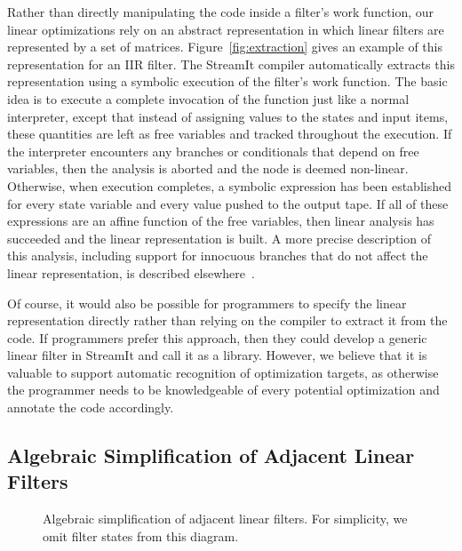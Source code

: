 Rather than directly manipulating the code inside a filter's work
function, our linear optimizations rely on an abstract representation
in which linear filters are represented by a set of matrices.
Figure~\ref{fig:extraction} gives an example of this representation
for an IIR filter.  The StreamIt compiler automatically extracts this
representation using a symbolic execution of the filter's work
function.  The basic idea is to execute a complete invocation of the
function just like a normal interpreter, except that instead of
assigning values to the states and input items, these quantities are
left as free variables and tracked throughout the execution.  If the
interpreter encounters any branches or conditionals that depend on
free variables, then the analysis is aborted and the node is deemed
non-linear.  Otherwise, when execution completes, a symbolic
expression has been established for every state variable and every
value pushed to the output tape.  If all of these expressions are an
affine function of the free variables, then linear analysis has
succeeded and the linear representation is built.  A more precise
description of this analysis, including support for innocuous branches
that do not affect the linear representation, is described
elsewhere~\cite{lamb-pldi03}.

Of course, it would also be possible for programmers to specify the
linear representation directly rather than relying on the compiler to
extract it from the code.  If programmers prefer this approach, then
they could develop a generic linear filter in StreamIt and call it as
a library.  However, we believe that it is valuable to support
automatic recognition of optimization targets, as otherwise the
programmer needs to be knowledgeable of every potential optimization
and annotate the code accordingly.

\subsection*{Algebraic Simplification of Adjacent Linear Filters}

\begin{figure}[t]
\centering
{}
\caption[Algebraic simplification of adjacent linear filters.]{Algebraic 
simplification of adjacent linear filters.  For simplicity, we omit
filter states from this diagram.\protect\label{fig:combination}}
\end{figure}


